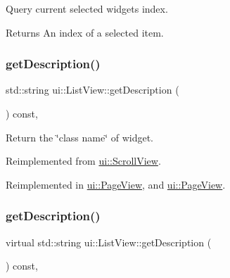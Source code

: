 Query current selected widget\textquotesingle{}s index. 

\begin{DoxyReturn}{Returns}
An index of a selected item. 
\end{DoxyReturn}
\mbox{\label{classui_1_1ListView_a653bb454095ef227949f7c791b68180c}} 
\subsubsection{\texorpdfstring{get\+Description()}{getDescription()}\hspace{0.1cm}{\footnotesize\ttfamily [1/2]}}
{\footnotesize\ttfamily std\+::string ui\+::\+List\+View\+::get\+Description (\begin{DoxyParamCaption}{ }\end{DoxyParamCaption}) const\hspace{0.3cm}{\ttfamily [override]}, {\ttfamily [virtual]}}

Return the \char`\"{}class name\char`\"{} of widget. 

Reimplemented from \hyperlink{classui_1_1ScrollView_a3a808390a8d9162dbbf83d5211e87f2e}{ui\+::\+Scroll\+View}.



Reimplemented in \hyperlink{classui_1_1PageView_aead0575c0e5d24da3731501afadf81e9}{ui\+::\+Page\+View}, and \hyperlink{classui_1_1PageView_a3c9b2934fdbbb44e2c456feee27b53de}{ui\+::\+Page\+View}.

\mbox{\label{classui_1_1ListView_a921a755d9787f976af9424ceb16a1aa3}} 
\subsubsection{\texorpdfstring{get\+Description()}{getDescription()}\hspace{0.1cm}{\footnotesize\ttfamily [2/2]}}
{\footnotesize\ttfamily virtual std\+::string ui\+::\+List\+View\+::get\+Description (\begin{DoxyParamCaption}{ }\end{DoxyParamCaption}) const\hspace{0.3cm}{\ttfamily [override]}, {\ttfamily [virtual]}}

